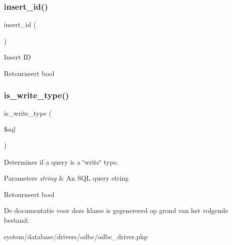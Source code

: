 \subsubsection{\texorpdfstring{insert\_id()}{insert\_id()}}
{\footnotesize\ttfamily insert\+\_\+id (\begin{DoxyParamCaption}{ }\end{DoxyParamCaption})}

Insert ID

\begin{DoxyReturn}{Retourneert}
bool 
\end{DoxyReturn}
\mbox{\label{class_c_i___d_b__odbc__driver_af435df5703c238769d6d16fde6d51182}} 
\subsubsection{\texorpdfstring{is\_write\_type()}{is\_write\_type()}}
{\footnotesize\ttfamily is\+\_\+write\+\_\+type (\begin{DoxyParamCaption}\item[{}]{\$sql }\end{DoxyParamCaption})}

Determines if a query is a \char`\"{}write\char`\"{} type.


\begin{DoxyParams}{Parameters}
{\em string} & An S\+QL query string \\
\hline
\end{DoxyParams}
\begin{DoxyReturn}{Retourneert}
bool 
\end{DoxyReturn}


De documentatie voor deze klasse is gegenereerd op grond van het volgende bestand\+:\begin{DoxyCompactItemize}
\item 
system/database/drivers/odbc/odbc\+\_\+driver.\+php\end{DoxyCompactItemize}
